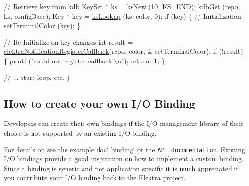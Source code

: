 \begin{DoxyCode}
        \textcolor{comment}{// Retrieve key from kdb}
        KeySet * ks = \hyperlink{group__keyset_ga671e1aaee3ae9dc13b4834a4ddbd2c3c}{ksNew} (10, \hyperlink{kdbenum_8c_a7a28fce3773b2c873c94ac80b8b4cd54}{KS\_END});
        \hyperlink{group__kdb_ga28e385fd9cb7ccfe0b2f1ed2f62453a1}{kdbGet} (repo, ks, configBase);
        Key * key = \hyperlink{group__keyset_gaa34fc43a081e6b01e4120daa6c112004}{ksLookup} (ks, color, 0);
        \textcolor{keywordflow}{if} (key) \{
                \textcolor{comment}{// Initialization}
                setTerminalColor (key);
        \}

        \textcolor{comment}{// Re-Initialize on key changes}
        \textcolor{keywordtype}{int} result = \hyperlink{notification_8c_aec859714220d1e6a476910433bb77d83}{elektraNotificationRegisterCallback}(repo, color, &
      setTerminalColor);
        \textcolor{keywordflow}{if} (!result) \{
                printf (\textcolor{stringliteral}{"could not register callback!\(\backslash\)n"});
                \textcolor{keywordflow}{return} -1;
        \}

        \textcolor{comment}{// ... start loop, etc.}
\}
\end{DoxyCode}


\subsection*{How to create your own I/O Binding}

Developers can create their own bindings if the I/O management library of their choice is not supported by an existing I/O binding.

For details on see the \hyperlink{md_src_bindings_io_doc_README_src_bindings_io_doc_README_md}{example }doc\char`\"{} binding\char`\"{} or the \href{https://doc.libelektra.org/api/current/html/group__kdbio.html}{\tt A\+PI documentation}. Existing I/O bindings provide a good inspiration on how to implement a custom binding. Since a binding is generic and not application specific it is much appreciated if you contribute your I/O binding back to the Elektra project. 